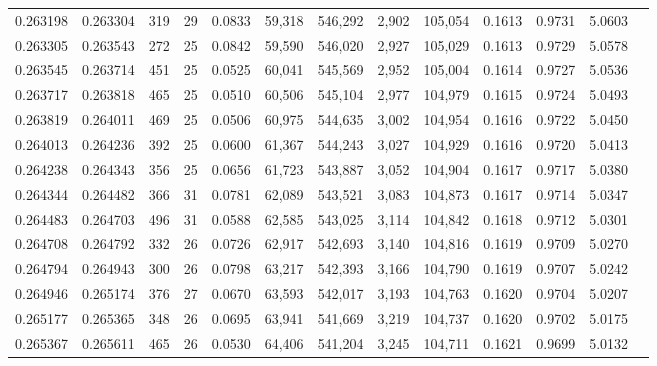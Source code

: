 \begin{tabular}{rrrrrrrrrrrrr}
0.263198 & 0.263304 &   319 &  29 &                                     0.0833 &  59,318 & 546,292 &   2,902 & 105,054 & 0.1613 & 0.9731 & 5.0603 \\
0.263305 & 0.263543 &   272 &  25 &                                     0.0842 &  59,590 & 546,020 &   2,927 & 105,029 & 0.1613 & 0.9729 & 5.0578 \\
0.263545 & 0.263714 &   451 &  25 &                                     0.0525 &  60,041 & 545,569 &   2,952 & 105,004 & 0.1614 & 0.9727 & 5.0536 \\
0.263717 & 0.263818 &   465 &  25 &                                     0.0510 &  60,506 & 545,104 &   2,977 & 104,979 & 0.1615 & 0.9724 & 5.0493 \\
0.263819 & 0.264011 &   469 &  25 &                                     0.0506 &  60,975 & 544,635 &   3,002 & 104,954 & 0.1616 & 0.9722 & 5.0450 \\
0.264013 & 0.264236 &   392 &  25 &                                     0.0600 &  61,367 & 544,243 &   3,027 & 104,929 & 0.1616 & 0.9720 & 5.0413 \\
0.264238 & 0.264343 &   356 &  25 &                                     0.0656 &  61,723 & 543,887 &   3,052 & 104,904 & 0.1617 & 0.9717 & 5.0380 \\
0.264344 & 0.264482 &   366 &  31 &                                     0.0781 &  62,089 & 543,521 &   3,083 & 104,873 & 0.1617 & 0.9714 & 5.0347 \\
0.264483 & 0.264703 &   496 &  31 &                                     0.0588 &  62,585 & 543,025 &   3,114 & 104,842 & 0.1618 & 0.9712 & 5.0301 \\
0.264708 & 0.264792 &   332 &  26 &                                     0.0726 &  62,917 & 542,693 &   3,140 & 104,816 & 0.1619 & 0.9709 & 5.0270 \\
0.264794 & 0.264943 &   300 &  26 &                                     0.0798 &  63,217 & 542,393 &   3,166 & 104,790 & 0.1619 & 0.9707 & 5.0242 \\
0.264946 & 0.265174 &   376 &  27 &                                     0.0670 &  63,593 & 542,017 &   3,193 & 104,763 & 0.1620 & 0.9704 & 5.0207 \\
0.265177 & 0.265365 &   348 &  26 &                                     0.0695 &  63,941 & 541,669 &   3,219 & 104,737 & 0.1620 & 0.9702 & 5.0175 \\
0.265367 & 0.265611 &   465 &  26 &                                     0.0530 &  64,406 & 541,204 &   3,245 & 104,711 & 0.1621 & 0.9699 & 5.0132 \\

\end{tabular}
